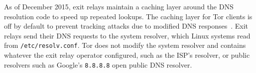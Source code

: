 As of December 2015, exit relays maintain a caching layer
around the DNS resolution code to speed up repeated lookups.
The caching layer for Tor clients is off by default to prevent tracking attacks
due to modified DNS responses~\cite{nolocalcache}. 
Exit relays send
their DNS requests to the system resolver, which Linux systems read from
\texttt{/etc/resolv.conf}.  Tor does not modify the system resolver and
contains whatever the exit relay operator configured, such as the ISP's resolver,
or public resolvers such as Google's {\tt 8.8.8.8} open public DNS resolver.
